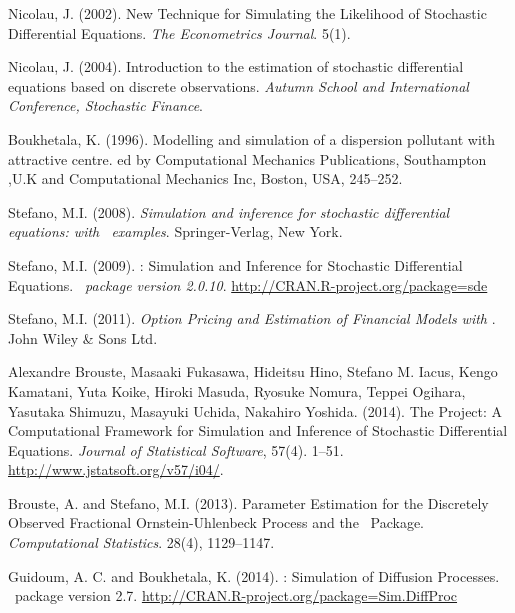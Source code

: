 \begin{thebibliography}{1}
Nicolau, J. (2002).
\newblock New Technique for Simulating the Likelihood of Stochastic Differential Equations.
\newblock \emph{The Econometrics Journal}. 5(1).

Nicolau, J. (2004).
\newblock  Introduction to the estimation of stochastic differential equations based on discrete observations.
\newblock  \emph{Autumn School and International Conference, Stochastic Finance}.

Boukhetala, K. (1996).
\newblock Modelling and simulation of a dispersion pollutant with attractive centre.
\newblock ed by Computational Mechanics Publications, Southampton ,U.K and Computational Mechanics Inc, Boston, USA, 245--252.

Stefano, M.I. (2008).
\newblock \emph{Simulation and inference for stochastic differential equations: with \R~examples}.
\newblock Springer-Verlag, New York.

Stefano, M.I. (2009).
\newblock {}: Simulation and Inference for Stochastic Differential Equations.
\newblock \emph{\R~package version 2.0.10}.
\newblock \url{http://CRAN.R-project.org/package=sde}

Stefano, M.I. (2011).
\newblock \emph{Option Pricing and Estimation of Financial Models with \R}.
\newblock John Wiley \& Sons Ltd.

Alexandre Brouste, Masaaki Fukasawa, Hideitsu Hino, Stefano M. Iacus, Kengo Kamatani, Yuta Koike, Hiroki Masuda, Ryosuke Nomura, Teppei Ogihara, Yasutaka Shimuzu, Masayuki Uchida, Nakahiro Yoshida. (2014).
\newblock The  Project: A Computational Framework for Simulation and Inference of Stochastic Differential Equations.
\newblock \emph{Journal of Statistical Software}, 57(4). 1--51.
\newblock \url{http://www.jstatsoft.org/v57/i04/}.

Brouste, A. and Stefano, M.I. (2013).
\newblock Parameter Estimation for the Discretely Observed Fractional Ornstein-Uhlenbeck Process and the  \R~Package.
\newblock \emph{Computational Statistics}. 28(4), 1129--1147.

Guidoum, A. C. and Boukhetala, K. (2014).
\newblock {}: Simulation of Diffusion Processes.
\newblock \R~package version 2.7.
\newblock \url{http://CRAN.R-project.org/package=Sim.DiffProc}


\end{thebibliography}
